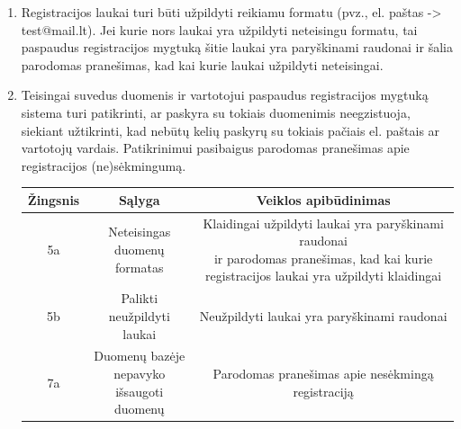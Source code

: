 \documentclass[12pt]{article}
\begin{document}
\begin{enumerate}
		\item Registracijos laukai turi būti užpildyti reikiamu formatu (pvz., el. paštas -> test@mail.lt). Jei kurie nors laukai yra užpildyti neteisingu formatu, tai paspaudus registracijos mygtuką šitie laukai yra paryškinami raudonai ir šalia parodomas pranešimas, kad kai kurie laukai užpildyti neteisingai.
		\pagebreak
		\item Teisingai suvedus duomenis ir vartotojui paspaudus registracijos mygtuką sistema turi patikrinti, ar paskyra su tokiais duomenimis neegzistuoja, siekiant užtikrinti, kad nebūtų kelių paskyrų su tokiais pačiais el. paštais ar vartotojų vardais. Patikrinimui pasibaigus parodomas pranešimas apie registracijos (ne)sėkmingumą.	
		
		\begin{center}
		\begin{tabular}{ | c | c | c | }
			\hline
			Žingsnis & Sąlyga                                     & Veiklos apibūdinimas \\ \hline
			5a       & \makecell{Neteisingas \\ duomenų formatas} & \makecell{Klaidingai užpildyti laukai yra paryškinami raudonai \\ ir parodomas pranešimas, kad kai kurie \\ registracijos laukai yra užpildyti klaidingai} \\ \hline
			5b       & \makecell{Palikti \\ neužpildyti laukai}   & Neužpildyti laukai yra paryškinami raudonai \\ \hline
			7a       & \makecell{Duomenų bazėje \\ nepavyko išsaugoti \\ duomenų} & Parodomas pranešimas apie nesėkmingą registraciją \\ \hline
		\end{tabular}
		\end{center}
	\end{enumerate}	
	\pagebreak
	
\end{document}
